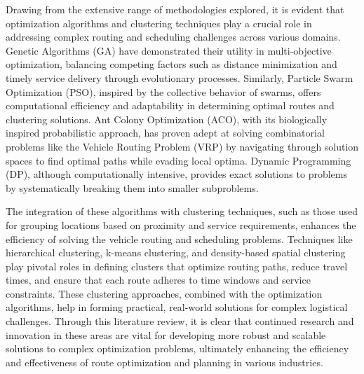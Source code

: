 Drawing from the extensive range of methodologies explored, it is evident that optimization algorithms and clustering techniques play a crucial role in addressing complex routing and scheduling challenges across various domains. Genetic Algorithms (GA) have demonstrated their utility in multi-objective optimization, balancing competing factors such as distance minimization and timely service delivery through evolutionary processes. Similarly, Particle Swarm Optimization (PSO), inspired by the collective behavior of swarms, offers computational efficiency and adaptability in determining optimal routes and clustering solutions. Ant Colony Optimization (ACO), with its biologically inspired probabilistic approach, has proven adept at solving combinatorial problems like the Vehicle Routing Problem (VRP) by navigating through solution spaces to find optimal paths while evading local optima. Dynamic Programming (DP), although computationally intensive, provides exact solutions to problems by systematically breaking them into smaller subproblems.

The integration of these algorithms with clustering techniques, such as those used for grouping locations based on proximity and service requirements, enhances the efficiency of solving the vehicle routing and scheduling problems. Techniques like hierarchical clustering, k-means clustering, and density-based spatial clustering play pivotal roles in defining clusters that optimize routing paths, reduce travel times, and ensure that each route adheres to time windows and service constraints. These clustering approaches, combined with the optimization algorithms, help in forming practical, real-world solutions for complex logistical challenges. Through this literature review, it is clear that continued research and innovation in these areas are vital for developing more robust and scalable solutions to complex optimization problems, ultimately enhancing the efficiency and effectiveness of route optimization and planning in various industries.


